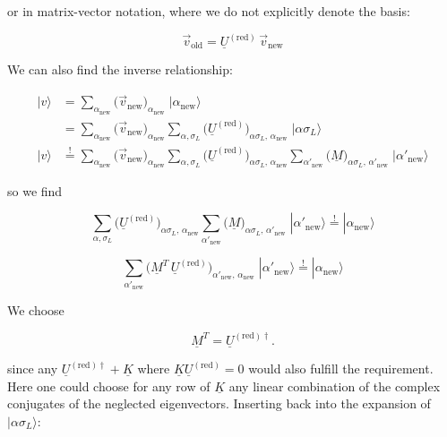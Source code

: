 or in matrix-vector notation, where we do not explicitly denote the
basis:

\begin{equation}
\boxed{\;\vec v_{\mathrm{old}} = \underline{U}^{(\mathrm{red})}\,\vec v_{\mathrm{new}}\;}
\end{equation}

We can also find the inverse relationship:

\begin{align}
|v\rangle &= \sum_{\alpha_{\mathrm{new}}}\big(\vec v_{\mathrm{new}}\big)_{\alpha_{\mathrm{new}}}\;|\alpha_{\mathrm{new}}\rangle\\
&= \sum_{\alpha_{\mathrm{new}}}\big(\vec v_{\mathrm{new}}\big)_{\alpha_{\mathrm{new}}}
\sum_{\alpha,\sigma_L}\big(\underline{U}^{(\mathrm{red})}\big)_{\alpha\sigma_L,\,\alpha_{\mathrm{new}}}\;|\alpha\sigma_L\rangle\\
|v\rangle &\overset{!}{=} \sum_{\alpha_{\mathrm{new}}}\big(\vec v_{\mathrm{new}}\big)_{\alpha_{\mathrm{new}}}
\sum_{\alpha,\sigma_L}\big(\underline{U}^{(\mathrm{red})}\big)_{\alpha\sigma_L,\,\alpha_{\mathrm{new}}}
\sum_{\alpha'_{\mathrm{new}}}\big(\underline{M}\big)_{\alpha\sigma_L,\,\alpha'_{\mathrm{new}}}\;|\alpha'_{\mathrm{new}}\rangle
\end{align}

so we find

\begin{equation}
\sum_{\alpha,\sigma_L}\big(\underline{U}^{(\mathrm{red})}\big)_{\alpha\sigma_L,\,\alpha_{\mathrm{new}}}
\sum_{\alpha'_{\mathrm{new}}}\big(\underline{M}\big)_{\alpha\sigma_L,\,\alpha'_{\mathrm{new}}}\;|\alpha'_{\mathrm{new}}\rangle
\overset{!}{=} |\alpha_{\mathrm{new}}\rangle
\end{equation}

\begin{equation}
\sum_{\alpha'_{\mathrm{new}}}\big(\underline{M}^{T}\,\underline{U}^{(\mathrm{red})}\big)_{\alpha'_{\mathrm{new}},\,\alpha_{\mathrm{new}}}\;|\alpha'_{\mathrm{new}}\rangle
\overset{!}{=} |\alpha_{\mathrm{new}}\rangle
\end{equation}

We choose

\begin{equation}
\underline{M}^{T} = \underline{U}^{(\mathrm{red})\dagger}.
\end{equation}

since any $\underline{U}^{(\mathrm{red})\dagger} + \underline{K}$
where $\underline{K}\underline{U}^{(\mathrm{red})}=0$ would also fulfill
the requirement. Here one could choose for any row of $\underline{K}$ any linear combination
of the complex conjugates of the neglected eigenvectors.
Inserting back into the expansion of $|\alpha\sigma_L\rangle$:

